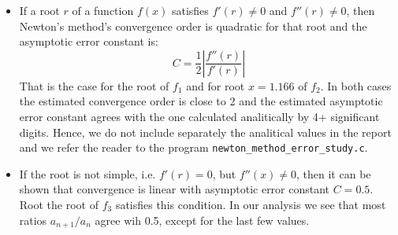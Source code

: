 \documentclass[a4paper,11]{article}
\newcommand{\mdcode}[1]{\lstinline[backgroundcolor=\color{gray!10}, frame=single, frameround=tttt]|#1|}
\begin{document}
\begin{itemize}
	\item{
		If a root $r$ of a function $f(x)$ satisfies $f'(r) \neq 0$ and 
		$f''(r) \neq 0$, then Newton's method's convergence order is quadratic
		for that root and the asymptotic error constant is:
\[
	C = \frac{1}{2}\left|\frac{f''(r)}{f'(r)}\right|
\]
		That is the case for the root of $f_{1}$ and for root $x = 1.166$ of
		$f_{2}$. In both cases the estimated convergence order is close to 2
		and the estimated asymptotic error constant agrees with the one
		calculated analitically by 4+ significant digits. Hence, we do not
		include separately the analitical values in the report and we refer
		the reader to the program \mdcode{newton_method_error_study.c}.
	}
	\item{
		If the root is not simple, i.e. $f'(r) = 0$, but $f''(x) \neq 0$, then
		it can be shown that convergence is linear with asymptotic error 
		constant $C = 0.5$. Root the root of $f_{3}$ satisfies this condition.
		In our analysis we see that most ratios $a_{n+1}/a_{n}$ agree wih 0.5,
		except for the last few values.
		
}
\end{itemize}
\end{document}
